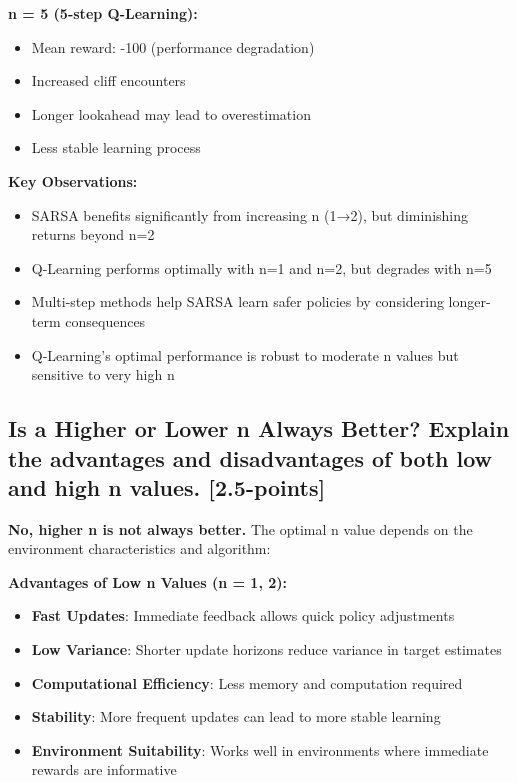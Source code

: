 \documentclass[12pt]{article}
\begin{document}
{{{\textbf{n = 5 (5-step Q-Learning):}
\begin{itemize}
    \item Mean reward: -100 (performance degradation)
    \item Increased cliff encounters
    \item Longer lookahead may lead to overestimation
    \item Less stable learning process
\end{itemize}

\textbf{Key Observations:}
\begin{itemize}
    \item SARSA benefits significantly from increasing n (1→2), but diminishing returns beyond n=2
    \item Q-Learning performs optimally with n=1 and n=2, but degrades with n=5
    \item Multi-step methods help SARSA learn safer policies by considering longer-term consequences
    \item Q-Learning's optimal performance is robust to moderate n values but sensitive to very high n
\end{itemize}

\subsection{Is a Higher or Lower n Always Better? Explain the advantages and disadvantages of both low and high n values. [2.5-points]}

\textbf{No, higher n is not always better.} The optimal n value depends on the environment characteristics and algorithm:

\textbf{Advantages of Low n Values (n = 1, 2):}
\begin{itemize}
    \item \textbf{Fast Updates}: Immediate feedback allows quick policy adjustments
    \item \textbf{Low Variance}: Shorter update horizons reduce variance in target estimates
    \item \textbf{Computational Efficiency}: Less memory and computation required
    \item \textbf{Stability}: More frequent updates can lead to more stable learning
    \item \textbf{Environment Suitability}: Works well in environments where immediate rewards are informative
\end{itemize}

}}}
\end{document}
